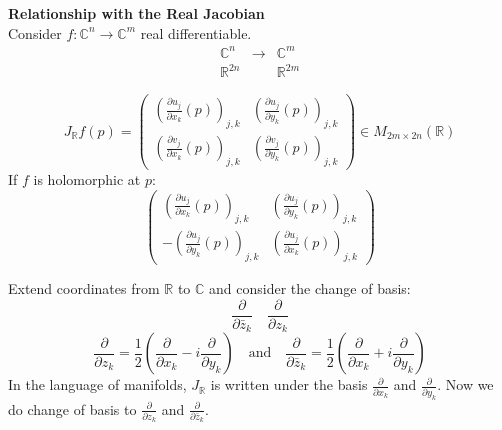 \documentclass{article}
\begin{document}
\textbf{Relationship with the Real Jacobian}\\
Consider $f: \mathbb{C}^n \to \mathbb{C}^m$ real differentiable.
$$
\begin{array}{ccc}
\mathbb{C}^n & \to & \mathbb{C}^m \\
\mathbb{R}^{2n} & & \mathbb{R}^{2m}
\end{array}
$$

$$
J_{\mathbb{R}} f(p) = \begin{pmatrix}
\left( \frac{\partial u_j}{\partial x_k} (p) \right)_{j, k} & \left( \frac{\partial u_j}{\partial y_k} (p) \right)_{j, k} \\
\left( \frac{\partial v_j}{\partial x_k} (p) \right)_{j, k} & \left( \frac{\partial v_j}{\partial y_k} (p) \right)_{j, k}
\end{pmatrix} \in M_{2m \times 2n} (\mathbb{R})
$$
If $f$ is holomorphic at $p$:
$$
\begin{pmatrix}
\left( \frac{\partial u_j}{\partial x_k} (p) \right)_{j, k} & \left( \frac{\partial u_j}{\partial y_k} (p) \right)_{j, k} \\
- \left( \frac{\partial u_j}{\partial y_k} (p) \right)_{j, k} & \left( \frac{\partial u_j}{\partial x_k} (p) \right)_{j, k}
\end{pmatrix}
$$

Extend coordinates from $\mathbb{R}$ to $\mathbb{C}$ and consider the change of basis:
$$
\frac{\partial}{\partial \bar{z}_k} \quad \frac{\partial}{\partial z_k}
$$
$$
\frac{\partial}{\partial z_k} = \frac{1}{2} \left( \frac{\partial}{\partial x_k} - i \frac{\partial}{\partial y_k} \right) \quad \text{and} \quad \frac{\partial}{\partial \bar{z}_k} = \frac{1}{2} \left( \frac{\partial}{\partial x_k} + i \frac{\partial}{\partial y_k} \right)
$$
In the language of manifolds, $J_{\mathbb{R}}$ is written under the basis $\frac{\partial}{\partial x_k}$ and $\frac{\partial}{\partial y_k}$.
Now we do change of basis to $\frac{\partial}{\partial z_k}$ and $\frac{\partial}{\partial \bar{z}_k}$.
\end{document}
